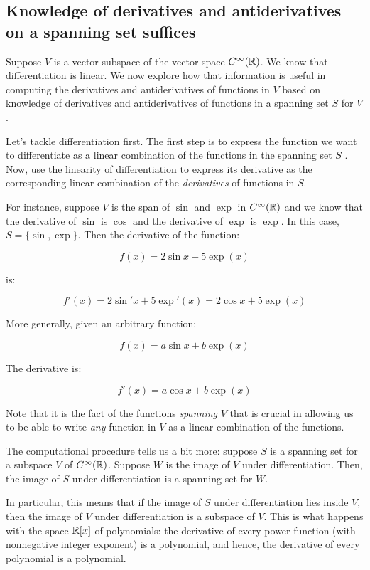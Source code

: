 \documentclass[10pt]{amsart}
\begin{document}
\subsection{Knowledge of derivatives and antiderivatives on a spanning set suffices}

Suppose $V$ is a vector subspace of the vector space
$C^\infty(\mathbb{R})$. We know that differentiation is linear. We now explore
how that information is useful in computing the derivatives and
antiderivatives of functions in $V$ based on knowledge of derivatives
and antiderivatives of functions in a spanning set $S$ for $V$.

Let's tackle differentiation first. The first step is to express the
function we want to differentiate as a linear combination of the
functions in the spanning set $S$ . Now, use the linearity of
differentiation to express its derivative as the corresponding linear
combination of the {\em derivatives} of functions in $S$.

For instance, suppose $V$ is the span of $\sin$ and $\exp$ in
$C^\infty(\mathbb{R})$ and we know that the derivative of $\sin$ is $\cos$ and
the derivative of $\exp$ is $\exp$. In this case, $S = \{ \sin, \exp
\}$. Then the derivative of the function:

$$f(x) = 2\sin x + 5 \exp(x)$$

is:

$$f'(x) = 2\sin'x + 5 \exp'(x) = 2\cos x + 5\exp(x)$$

More generally, given an arbitrary function:

$$f(x) = a\sin x + b \exp(x)$$

The derivative is:

$$f'(x) = a\cos x + b\exp(x)$$

Note that it is the fact of the functions {\em spanning} $V$ that is
crucial in allowing us to be able to write {\em any} function in $V$
as a linear combination of the functions.

The computational procedure tells us a bit more: suppose $S$ is a
spanning set for a subspace $V$ of $C^\infty(\mathbb{R})$. Suppose $W$ is the
image of $V$ under differentiation. Then, the image of $S$ under
differentiation is a spanning set for $W$.

In particular, this means that if the image of $S$ under
differentiation lies inside $V$, then the image of $V$ under
differentiation is a subspace of $V$. This is what happens with the
space $\mathbb{R}[x]$ of polynomials: the derivative of every power function
(with nonnegative integer exponent) is a polynomial, and hence, the
derivative of every polynomial is a polynomial.
\end{document}

